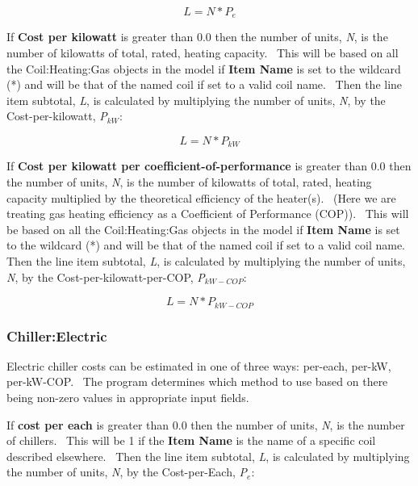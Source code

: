 \begin{equation}
L = N * {P_e}
\end{equation}

If \textbf{Cost per kilowatt} is greater than 0.0 then the number of units, \emph{N}, is the number of kilowatts of total, rated, heating capacity.~ This will be based on all the Coil:Heating:Gas objects in the model if \textbf{Item Name} is set to the wildcard (*) and will be that of the named coil if set to a valid coil name.~ Then the line item subtotal, \emph{L}, is calculated by multiplying the number of units, \emph{N}, by the Cost-per-kilowatt, \emph{P\(_{kW}\)}:

\begin{equation}
L = N * {P_{kW}}
\end{equation}

If \textbf{Cost per kilowatt per coefficient-of-performance} is greater than 0.0 then the number of units, \emph{N}, is the number of kilowatts of total, rated, heating capacity multiplied by the theoretical efficiency of the heater(s).~ (Here we are treating gas heating efficiency as a Coefficient of Performance (COP)).~ This will be based on all the Coil:Heating:Gas objects in the model if \textbf{Item Name} is set to the wildcard (*) and will be that of the named coil if set to a valid coil name.~ Then the line item subtotal, \emph{L}, is calculated by multiplying the number of units, \emph{N}, by the Cost-per-kilowatt-per-COP, \emph{P\(_{kW-COP}\)}:

\begin{equation}
L = N * {P_{kW - COP}}
\end{equation}

\subsubsection{Chiller:Electric}\label{chillerelectric}

Electric chiller costs can be estimated in one of three ways: per-each, per-kW, per-kW-COP.~ The program determines which method to use based on there being non-zero values in appropriate input fields.

If \textbf{cost per each} is greater than 0.0 then the number of units, \emph{N}, is the number of chillers.~ This will be 1 if the \textbf{Item Name} is the name of a specific coil described elsewhere.~ Then the line item subtotal, \emph{L}, is calculated by multiplying the number of units, \emph{N}, by the Cost-per-Each, \emph{P\(_{e}\)}:

